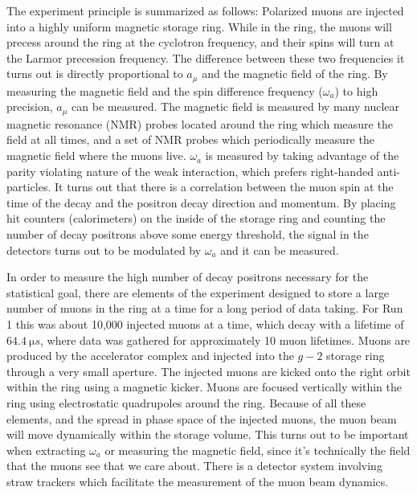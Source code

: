 \documentclass[12pt,letterpaper]{article}
\def\wa{$\omega_{a}$\xspace}
\def\gmtwo{$g-2$\xspace}
\def\amu{$a_{\mu}$\xspace}
\begin{document}
The experiment principle is summarized as follows: Polarized muons are injected into a highly uniform magnetic storage ring. While in the ring, the muons will precess around the ring at the cyclotron frequency, and their spins will turn at the Larmor precession frequency. The difference between these two frequencies it turns out is directly proportional to \amu and the magnetic field of the ring. By measuring the magnetic field and the spin difference frequency (\wa) to high precision, \amu can be measured. The magnetic field is measured by many nuclear magnetic resonance (NMR) probes located around the ring which measure the field at all times, and a set of NMR probes which periodically measure the magnetic field where the muons live. \wa is measured by taking advantage of the parity violating nature of the weak interaction, which prefers right-handed anti-particles. It turns out that there is a correlation between the muon spin at the time of the decay and the positron decay direction and momentum. By placing hit counters (calorimeters) on the inside of the storage ring and counting the number of decay positrons above some energy threshold, the signal in the detectors turns out to be modulated by \wa and it can be measured.


In order to measure the high number of decay positrons necessary for the statistical goal, there are elements of the experiment designed to store a large number of muons in the ring at a time for a long period of data taking. For Run 1 this was about 10,000 injected muons at a time, which decay with a lifetime of $\SI{64.4}{\micro s}$, where data was gathered for approximately 10 muon lifetimes. Muons are produced by the accelerator complex and injected into the \gmtwo storage ring through a very small aperture. The injected muons are kicked onto the right orbit within the ring using a magnetic kicker. Muons are focused vertically within the ring using electrostatic quadrupoles around the ring. Because of all these elements, and the spread in phase space of the injected muons, the muon beam will move dynamically within the storage volume. This turns out to be important when extracting \wa or measuring the magnetic field, since it's technically the field that the muons see that we care about. There is a detector system involving straw trackers which facilitate the measurement of the muon beam dynamics.
\end{document}
